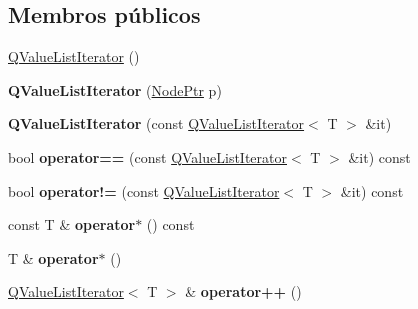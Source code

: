\subsection*{Membros públicos}
\begin{DoxyCompactItemize}
\item 
\hyperlink{class_q_value_list_iterator_aa5133bb61d5a4d7ccb5de5e69aa39f07}{Q\-Value\-List\-Iterator} ()
\item 
\hypertarget{class_q_value_list_iterator_adb3a0ab42df14b7512782abec9bec96a}{{\bfseries Q\-Value\-List\-Iterator} (\hyperlink{class_q_value_list_iterator_a33149bd41c7bb5c96791c9455305e769}{Node\-Ptr} p)}\label{class_q_value_list_iterator_adb3a0ab42df14b7512782abec9bec96a}

\item 
\hypertarget{class_q_value_list_iterator_a654b2dfb90b98560c4d5d49bb4dc43b0}{{\bfseries Q\-Value\-List\-Iterator} (const \hyperlink{class_q_value_list_iterator}{Q\-Value\-List\-Iterator}$<$ T $>$ \&it)}\label{class_q_value_list_iterator_a654b2dfb90b98560c4d5d49bb4dc43b0}

\item 
\hypertarget{class_q_value_list_iterator_a1aeade32bf0498998eefeef4aefe1998}{bool {\bfseries operator==} (const \hyperlink{class_q_value_list_iterator}{Q\-Value\-List\-Iterator}$<$ T $>$ \&it) const }\label{class_q_value_list_iterator_a1aeade32bf0498998eefeef4aefe1998}

\item 
\hypertarget{class_q_value_list_iterator_a207ae496dbf031d8caa92b64f46b3187}{bool {\bfseries operator!=} (const \hyperlink{class_q_value_list_iterator}{Q\-Value\-List\-Iterator}$<$ T $>$ \&it) const }\label{class_q_value_list_iterator_a207ae496dbf031d8caa92b64f46b3187}

\item 
\hypertarget{class_q_value_list_iterator_a0ad02595c2fdf7a496eda1d646060eab}{const T \& {\bfseries operator$\ast$} () const }\label{class_q_value_list_iterator_a0ad02595c2fdf7a496eda1d646060eab}

\item 
\hypertarget{class_q_value_list_iterator_af7f8c6b921dca2b94f6e7ee14e762770}{T \& {\bfseries operator$\ast$} ()}\label{class_q_value_list_iterator_af7f8c6b921dca2b94f6e7ee14e762770}

\item 
\hypertarget{class_q_value_list_iterator_a04565a63943ac8796732a017ce41e518}{\hyperlink{class_q_value_list_iterator}{Q\-Value\-List\-Iterator}$<$ T $>$ \& {\bfseries operator++} ()}\label{class_q_value_list_iterator_a04565a63943ac8796732a017ce41e518}


\end{DoxyCompactItemize}

